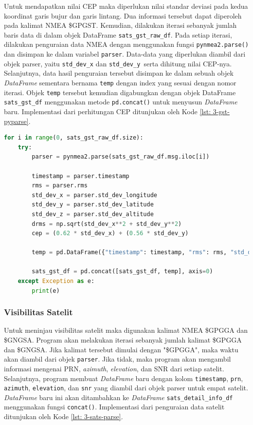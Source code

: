 Untuk mendapatkan nilai CEP maka diperlukan nilai standar deviasi pada kedua koordinat garis bujur dan garis lintang. Dua informasi tersebut dapat diperoleh pada kalimat NMEA \$GPGST. Kemudian, dilakukan iterasi sebanyak jumlah baris data di dalam objek DataFrame \texttt{sats\_gst\_raw\_df}. Pada setiap iterasi, dilakukan penguraian data NMEA dengan menggunakan fungsi \texttt{pynmea2.parse()} dan disimpan ke dalam variabel \texttt{parser}. Data-data yang diperlukan diambil dari objek parser, yaitu \texttt{std\_dev\_x} dan \texttt{std\_dev\_y }serta dihitung nilai CEP-nya. Selanjutnya, data hasil penguraian tersebut disimpan ke dalam sebuah objek \textit{DataFrame} sementara bernama \texttt{temp} dengan index yang sesuai dengan nomor iterasi. Objek \texttt{temp} tersebut kemudian digabungkan dengan objek DataFrame \texttt{sats\_gst\_df} menggunakan metode \texttt{pd.concat()} untuk menyusun \textit{DataFrame} baru. Implementasi dari perhitungan CEP ditunjukan oleh Kode \ref{lst: 3-gst-pyparse}.

\vspace{0.3cm}
\begin{lstlisting}[language=python, style=mystyle, caption={\textit{Parsing} Kalimat \$GNGSA pada Python}, label={lst: 3-gst-pyparse}]
for i in range(0, sats_gst_raw_df.size):
	try:
		parser = pynmea2.parse(sats_gst_raw_df.msg.iloc[i])
		
		timestamp = parser.timestamp
		rms = parser.rms
		std_dev_x = parser.std_dev_longitude
		std_dev_y = parser.std_dev_latitude
		std_dev_z = parser.std_dev_altitude
		drms = np.sqrt(std_dev_x**2 + std_dev_y**2)
		cep = (0.62 * std_dev_x) + (0.56 * std_dev_y)
		
		temp = pd.DataFrame({"timestamp": timestamp, "rms": rms, "std_dev_x": std_dev_x, "std_dev_y": std_dev_y, "std_dev_z": std_dev_z, "drms": drms, "cep": cep}, index=[i])
		
		sats_gst_df = pd.concat([sats_gst_df, temp], axis=0)
	except Exception as e:
		print(e)
\end{lstlisting}

\subsubsection{Visibilitas Satelit}
Untuk meninjau visibilitas satelit maka digunakan kalimat NMEA \$GPGGA dan \$GNGSA. Program akan melakukan iterasi sebanyak jumlah kalimat \$GPGGA dan \$GNGSA. Jika kalimat tersebut dimulai dengan "\$GPGGA", maka waktu akan diambil dari objek \texttt{parser}. Jika tidak, maka program akan mengambil informasi mengenai PRN, \textit{azimuth}, \textit{elevation}, dan SNR dari setiap satelit. Selanjutnya, program membuat \textit{DataFrame} baru dengan kolom \texttt{timestamp}, \texttt{prn}, \texttt{azimuth}, \texttt{elevation}, dan \texttt{snr} yang diambil dari objek parser untuk empat satelit. \textit{DataFrame} baru ini akan ditambahkan ke \textit{DataFrame} \texttt{sats\_detail\_info\_df} menggunakan fungsi \texttt{concat()}. Implementasi dari penguraian data satelit ditunjukan oleh Kode \ref{lst: 3-sats-parse}.

